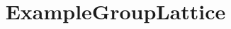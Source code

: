 \documentclass{test}
\begin{document}
\title{ExampleGroupLattice} \maketitle \noindent




\end{document}
